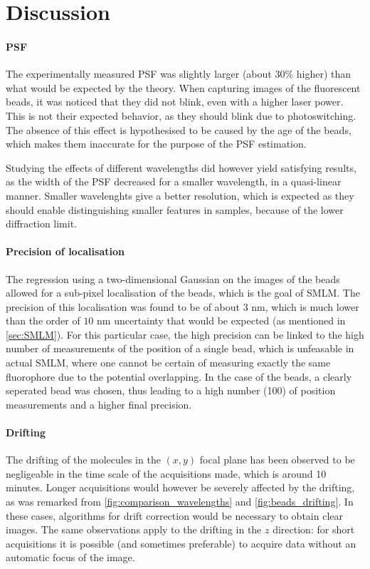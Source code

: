 \section{Discussion}
\paragraph{PSF}
The experimentally measured PSF was slightly larger (about $30$\% higher) than what would be expected by the theory. When capturing images of the fluorescent beads, it was noticed that they did not blink, even with a higher laser power. This is not their expected behavior, as they should blink due to photoswitching. The absence of this effect is hypothesised to be caused by the age of the beads, which makes them inaccurate for the purpose of the PSF estimation.

Studying the effects of different wavelengths did however yield satisfying results, as the width of the PSF decreased for a smaller wavelength, in a quasi-linear manner. Smaller wavelenghts give a better resolution, which is expected as they should enable distinguishing smaller features in samples, because of the lower diffraction limit.

\paragraph{Precision of localisation}
The regression using a two-dimensional Gaussian on the images of the beads allowed for a sub-pixel localisation of the beads, which is the goal of SMLM. The precision of this localisation was found to be of about $3$ nm, which is much lower than the order of $10$ nm uncertainty that would be expected (as mentioned in \autoref{sec:SMLM}). For this particular case, the high precision can be linked to the high number of measurements of the position of a single bead, which is unfeasable in actual SMLM, where one cannot be certain of measuring exactly the same fluorophore due to the potential overlapping. In the case of the beads, a clearly seperated bead was chosen, thus leading to a high number (100) of position measurements and a higher final precision.

\paragraph{Drifting}
The drifting of the molecules in the $(x,y)$ focal plane has been observed to be negligeable in the time scale of the acquisitions made, which is around 10 minutes.
Longer acquisitions would however be severely affected by the drifting, as was remarked from \autoref{fig:comparison_wavelengths} and \autoref{fig:beads_drifting}.
In these cases, algorithms for drift correction would be necessary to obtain clear images.
The same observations apply to the drifting in the $z$ direction: for short acquisitions it is possible (and sometimes preferable) to acquire data without an automatic focus of the image.


